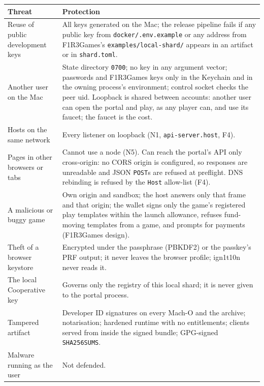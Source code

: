 \documentclass[11pt]{article}
\theoremstyle{definition}
\theoremstyle{remark}
\newcommand{\code}[1]{\texttt{#1}}
\newcommand{\Hr}{ign1t10n}
\newcommand{\Gm}{F1R3Games}
\begin{document}
\begin{center}\small
\renewcommand{\arraystretch}{1.15}
\begin{tabularx}{\linewidth}{@{}p{3.5cm}X@{}}
\toprule
Threat & Protection\\
\midrule
Reuse of public development keys & All keys generated on the Mac; the release pipeline fails if any public key from \code{docker/.env.example} or any address from \Gm{}'s \code{examples/local-shard/} appears in an artifact or in \code{shard.toml}.\\
Another user on the Mac & State directory \code{0700}; no key in any argument vector; passwords and \Gm{} keys only in the Keychain and in the owning process's environment; control socket checks the peer uid. Loopback is shared between accounts: another user can open the portal and play, as any player can, and use its faucet; the faucet is the cost.\\
Hosts on the same network & Every listener on loopback (N1, \code{api-server.host}, F4).\\
Pages in other browsers or tabs & Cannot use a node (N5). Can reach the portal's API only cross-origin: no CORS origin is configured, so responses are unreadable and JSON \code{POST}s are refused at preflight. DNS rebinding is refused by the \code{Host} allow-list (F4).\\
A malicious or buggy game & Own origin and sandbox; the host answers only that frame and that origin; the wallet signs only the game's registered play templates within the launch allowance, refuses fund-moving templates from a game, and prompts for payments (\Gm{} design).\\
Theft of a browser keystore & Encrypted under the passphrase (PBKDF2) or the passkey's PRF output; it never leaves the browser profile; \Hr{} never reads it.\\
The local Cooperative key & Governs only the registry of this local shard; it is never given to the portal process.\\
Tampered artifact & Developer ID signatures on every Mach-O and the archive; notarisation; hardened runtime with no entitlements; clients served from inside the signed bundle; GPG-signed \code{SHA256SUMS}.\\
Malware running as the user & Not defended.\\
\bottomrule
\end{tabularx}
\end{center}

\end{document}
